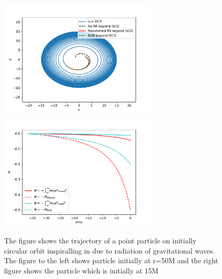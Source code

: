 \documentclass[prd,preprintnumbers,onecolumn,eqsecnum,floatfix,letter]{revtex4}
\begin{document}
\begin{figure}
	\includegraphics[width=3.0in]{../plots/OrbitEOB_Vs_BOB_beyodISCO.pdf}
	\includegraphics[width=3.0in]{../plots/Psi2EOBHamiltonia_Comparision_usingResumModel.pdf}
	\caption{The figure shows the trajectory of a point particle on initially circular orbit inspiralling in due to radiation of gravitational waves. The figure to the left shows particle initially at r=50M and the right figure shows the particle which is initially at 15M}
	\label{fig:BoBpsiCOMP}
\end{figure} 
\end{document}
